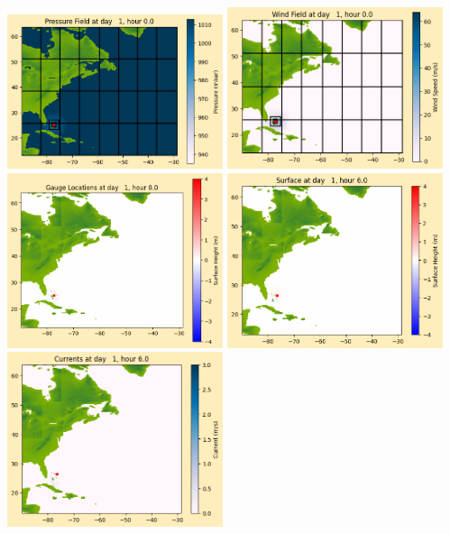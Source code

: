 \documentclass[11pt]{article}
\begin{document}
\includegraphics[width=0.475\textwidth]{frame0016fig1012.png}
\vskip 10pt 
\includegraphics[width=0.475\textwidth]{frame0016fig1013.png}
\includegraphics[width=0.475\textwidth]{frame0016fig1014.png}
\vskip 10pt 
\includegraphics[width=0.475\textwidth]{frame0017fig1001.png}
\includegraphics[width=0.475\textwidth]{frame0017fig1002.png}
\end{document}
